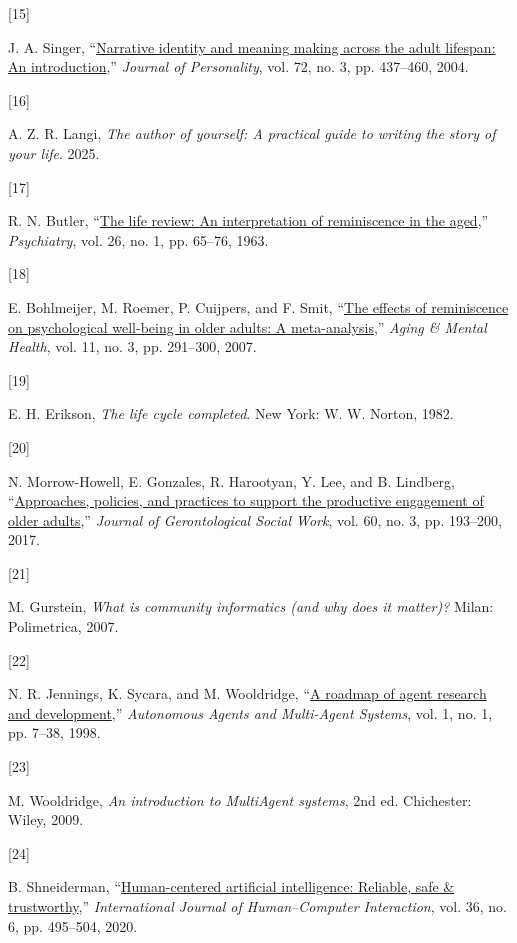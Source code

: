 \documentclass[
  journal,
]{IEEEtran}%
\newlength{\cslhangindent}
\newlength{\csllabelwidth}
\newenvironment{CSLReferences}[2] %
 {\begin{list}{}{%
  \setlength{\itemindent}{0pt}
  \setlength{\leftmargin}{0pt}
  \setlength{\parsep}{0pt}
  \ifodd #1
   \setlength{\leftmargin}{\cslhangindent}
   \setlength{\itemindent}{-1\cslhangindent}
  \fi
  \setlength{\itemsep}{#2\baselineskip}}}
 {\end{list}}
\newcommand{\CSLLeftMargin}[1]{\parbox[t]{\csllabelwidth}{\strut#1\strut}}
\newcommand{\CSLRightInline}[1]{\parbox[t]{\linewidth - \csllabelwidth}{\strut#1\strut}}
\begin{document}
\begin{CSLReferences}{0}{0}
\CSLLeftMargin{{[}15{]} }%
\CSLRightInline{J. A. Singer,
{``\href{https://doi.org/10.1111/j.0022-3506.2004.00268.x}{Narrative
identity and meaning making across the adult lifespan: An
introduction},''} \emph{Journal of Personality}, vol. 72, no. 3, pp.
437--460, 2004. }

\CSLLeftMargin{{[}16{]} }%
\CSLRightInline{A. Z. R. Langi, \emph{The author of yourself: A
practical guide to writing the story of your life}. 2025. }

\CSLLeftMargin{{[}17{]} }%
\CSLRightInline{R. N. Butler,
{``\href{https://doi.org/10.1080/00332747.1963.11023339}{The life
review: An interpretation of reminiscence in the aged},''}
\emph{Psychiatry}, vol. 26, no. 1, pp. 65--76, 1963. }

\CSLLeftMargin{{[}18{]} }%
\CSLRightInline{E. Bohlmeijer, M. Roemer, P. Cuijpers, and F. Smit,
{``\href{https://doi.org/10.1080/13607860600963547}{The effects of
reminiscence on psychological well-being in older adults: A
meta-analysis},''} \emph{Aging \& Mental Health}, vol. 11, no. 3, pp.
291--300, 2007. }

\CSLLeftMargin{{[}19{]} }%
\CSLRightInline{E. H. Erikson, \emph{The life cycle completed}. New
York: W. W. Norton, 1982. }

\CSLLeftMargin{{[}20{]} }%
\CSLRightInline{N. Morrow-Howell, E. Gonzales, R. Harootyan, Y. Lee, and
B. Lindberg,
{``\href{https://doi.org/10.1080/01634372.2016.1275912}{Approaches,
policies, and practices to support the productive engagement of older
adults},''} \emph{Journal of Gerontological Social Work}, vol. 60, no.
3, pp. 193--200, 2017. }

\CSLLeftMargin{{[}21{]} }%
\CSLRightInline{M. Gurstein, \emph{What is community informatics (and
why does it matter)?} Milan: Polimetrica, 2007. }

\CSLLeftMargin{{[}22{]} }%
\CSLRightInline{N. R. Jennings, K. Sycara, and M. Wooldridge,
{``\href{https://doi.org/10.1023/A:1010090405266}{A roadmap of agent
research and development},''} \emph{Autonomous Agents and Multi-Agent
Systems}, vol. 1, no. 1, pp. 7--38, 1998. }

\CSLLeftMargin{{[}23{]} }%
\CSLRightInline{M. Wooldridge, \emph{An introduction to MultiAgent
systems}, 2nd ed. Chichester: Wiley, 2009. }

\CSLLeftMargin{{[}24{]} }%
\CSLRightInline{B. Shneiderman,
{``\href{https://doi.org/10.1080/10447318.2020.1741118}{Human-centered
artificial intelligence: Reliable, safe \& trustworthy},''}
\emph{International Journal of Human--Computer Interaction}, vol. 36,
no. 6, pp. 495--504, 2020. }

\end{CSLReferences}
\end{document}
